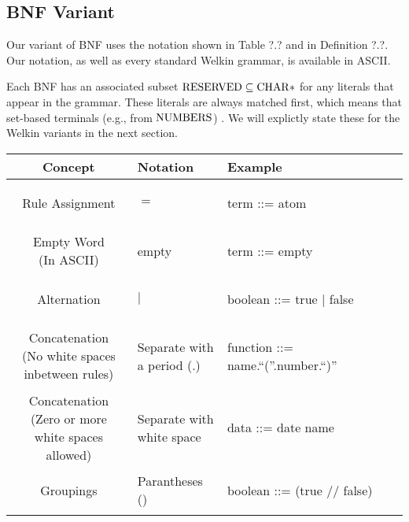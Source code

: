 \subsection{BNF Variant}
Our variant of BNF uses the notation shown in Table ?.? and in Definition ?.?. Our notation, as well as every standard Welkin grammar, is available in ASCII.

Each BNF has an associated subset $\mathrm{RESERVED} \subseteq \mathrm{CHAR}*$ for any literals that appear in the grammar. These literals are always matched first, which means that set-based terminals (e.g., from $\mathrm{NUMBERS}$) . We will explictly state these for the Welkin variants in the next section.

\begin{center}
  \begin{tabular}{ | c | p{2cm} | p{6cm} | }
  \hline
  \textbf{Concept} & \textbf{Notation} & \textbf{Example} \\
  \hline
  Rule Assignment & $=$ & \begin{bnf} term ::= atom\end{bnf}\\
  \hline
  \makecell{Empty Word \\ (In ASCII)} & empty & \begin{bnf} term ::= empty\end{bnf}\\
  \hline
  Alternation & $|$ & \begin{bnf} boolean ::= true | false \end{bnf}\\
  \hline
  \makecell{Concatenation \\ (No white spaces \\ inbetween rules)} & \makecell{Separate with \\  a period (.)}&  \begin{bnf} function ::= name.``(''.number.``)''\end{bnf} \\
  \hline
  \makecell{Concatenation \\ (Zero or more \\ white spaces allowed)} & \makecell{Separate with \\ white space} & \begin{bnf} data ::= date name\end{bnf} \\
  \hline
  Groupings & Parantheses () & \begin{bnf} boolean ::= (true // false)\end{bnf} \\

\end{tabular}
\end{center}
